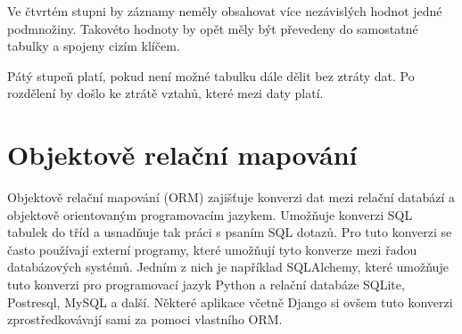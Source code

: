 Ve čtvrtém stupni by záznamy neměly obsahovat více nezávislých hodnot jedné podmnožiny. 
Takovéto hodnoty by opět měly být převedeny do samostatné tabulky a spojeny cizím klíčem.

Pátý stupeň platí, pokud není možné tabulku dále dělit bez ztráty dat. Po 
rozdělení by došlo ke ztrátě vztahů, které mezi daty platí. \cite{normalizace}



\section{Objektově relační mapování}

Objektově relační mapování (ORM) zajišťuje konverzi dat mezi relační
databází a objektově orientovaným programovacím jazykem. Umožňuje
konverzi SQL tabulek do tříd a usnadňuje tak práci s psaním SQL
dotazů. Pro tuto konverzi se často používají externí programy, které
umožňují tyto konverze mezi řadou databázových systémů. Jedním z nich
je například SQLAlchemy, které umožňuje tuto konverzi pro programovací
jazyk Python a relační databáze SQLite, Postresql, MySQL a
další. Některé aplikace včetně Django si ovšem tuto konverzi
zprostředkovávají sami za pomoci vlastního ORM. \cite{orm}
\cite{sqlalchemy}



















